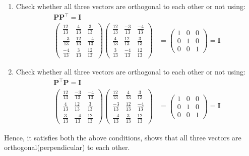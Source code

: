 \documentclass[12pt]{article}
\newcommand{\myvec}[1]{\ensuremath{\begin{pmatrix}#1\end{pmatrix}}}
\let\vec\mathbf
\begin{document}
			\begin{enumerate}
				\item Check whether all three vectors are orthogonal to each other or not using: 
			\begin{align}
		\vec{P}\vec{P}^\top=\vec{I}\\
				\myvec{\frac{12}{13}&\frac{4}{13}    &\frac{3}{13}\\[2pt] \frac{-3}{13}&\frac{12}{13}&\frac{-4}{13}\\[2pt] \frac{-4}{13}&\frac{3}{13}&\frac{12}{13}}\myvec{\frac{12}{13}&\frac{-3}{13}   &\frac{-4}{13}\\[2pt] \frac{4}{13}&\frac{12}{13}&\frac{3}{13}\\[2pt] \frac{3}{13}&\frac{-4}{13}&\frac{12}{13}}&=\myvec{1&0&0\\[2pt]0&1&0\\[2pt]0&0&1}=\vec{I}
		\end{align}
	\item Check whether all three vectors are orthogonal to each other or not using:
\begin{align}
	\vec{P}^\top\vec{P}=\vec{I}\\
				\myvec{\frac{12}{13}&\frac{-3}{13}    &\frac{-4}{13}\\[2pt] \frac{4}{13}&\frac{12}{13}&\frac{3}{13}\\[2pt] \frac{3}{13}&\frac{-4}{13}&\frac{12}{13}}\myvec{\frac{12}{13}&\frac{4}{13}   &\frac{3}{13}\\[2pt] \frac{-3}{13}&\frac{12}{13}&\frac{-4}{13}\\[2pt] \frac{-4}{13}&\frac{3}{13}&\frac{12}{13}}&=\myvec{1&0&0\\[2pt]0&1&0\\[2pt]0&0&1}=\vec{I}
		\end{align}
			\end{enumerate}
					Hence, it satisfies both the above conditions, shows  that all three vectors are orthogonal(perpendicular) to each other.
			
\end{document}
